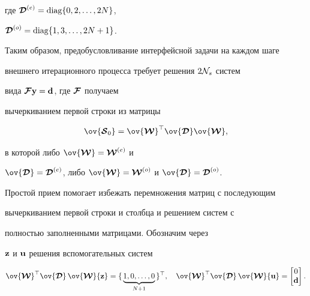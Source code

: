 где $\boldsymbol {\cal D}^{(e)}=\operatorname{diag}\{0,2,\dotsc, 2N\}$,


$\boldsymbol {\cal D}^{(o)}=\operatorname{diag}\{1,3,\dotsc, 2N+1\}$. 


Таким образом, предобусловливание интерфейсной задачи на каждом шаге


внешнего итерационного процесса требует решения $2{\cal N}_s$ систем 


вида $\boldsymbol {\cal F}{\bold y}={\bold d}$, где $\boldsymbol {\cal F}$ получаем 


вычеркиванием первой строки из матрицы


\begin{equation*}




\ov{\bc S_0} = \ov{\bc W}^\top\ov{\bc D}


\ov{\bc W},


\end{equation*}


в которой либо $\ov{\bi{\cal W}}=\bi{\cal W}^{(e)}$ и


$\ov{\bi{\cal D}}=\bi{\cal D}^{(e)}$, либо $\ov{\bi{\cal W}}=\bi{\cal


W}^{(o)}$ и $\ov{\bi{\cal D}}=\bi{\cal D}^{(o)}$. 


Простой прием помогает избежать перемножения матриц с последующим 


вычеркиванием первой строки и столбца и решением систем с


полностью заполненными матрицами. Обозначим через 


$\bold z$ и $\bold u$ решения вспомогательных систем


\begin{equation}


\label{helpsys}


\ov{\bi{\cal W}}^\top\ov{\bi{\cal D}}\,


\ov{\bi{\cal W}}{\bold


z}=\{\,\underbrace{1,0,\dotsc,0}_{N+1}\,\}^\top,\quad


\ov{\bi{\cal W}}^\top\ov{\bi{\cal D}}\,


\ov{\bi{\cal W}}{\bold u}=


\begin{bmatrix}


0 \\ {\bold d} 


\end{bmatrix}.


\end{equation}


